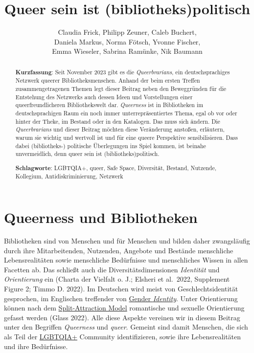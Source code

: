 \documentclass[a4paper,
fontsize=11pt,
oneside,
numbers=noperiodatend,
parskip=half-,
bibliography=totoc,
final
]{scrartcl}
\title{\LARGE{Queer sein ist (bibliotheks)politisch}}%
\author{Claudia Frick, Philipp Zeuner, Caleb Buchert,\\ Daniela Markus, Norma Fötsch, Yvonne Fischer,\\ Emma Wieseler, Sabrina Ramünke, Nik Baumann} %
\date{}
\begin{document}
\maketitle
\thispagestyle{fancyplain} 

\begin{abstract}
\noindent
\textbf{Kurzfassung}: Seit November 2023 gibt es die \textit{Queerbrarians}, ein 
deutschsprachiges Netzwerk queerer Bibliotheksmenschen. Anhand der beim 
ersten Treffen zusammengetragenen Themen legt dieser Beitrag neben den Beweggründen 
für die Entstehung des Netzwerks auch dessen Ideen und Vorstellungen einer 
queerfreundlicheren Bibliothekswelt dar. \textit{Queerness} ist in Bibliotheken im 
deutschsprachigen Raum ein noch immer unterrepräsentiertes Thema, egal ob vor 
oder hinter der Theke, im Bestand oder in den Katalogen. Das muss sich ändern. 
Die \textit{Queerbrarians} und dieser Beitrag möchten diese Veränderung anstoßen, erläutern, 
warum sie wichtig und wertvoll ist und für eine queere Perspektive sensibilisieren. 
Dass dabei (bibliotheks-) politische Überlegungen ins Spiel kommen, ist beinahe 
unvermeidlich, denn queer sein ist (bibliotheks)politisch.
\end{abstract}

\begin{abstract}
\noindent
\textbf{Schlagworte}: LGBTQIA+, queer, Safe Space, Diversität, Bestand, Nutzende, Kollegium, Antidiskriminierung, Netzwerk
\end{abstract}

\section{Queerness und
Bibliotheken}\label{queerness-und-bibliotheken}

Bibliotheken sind von Menschen und für Menschen und bilden daher
zwangsläufig durch ihre Mitarbeitenden, Nutzenden, Angebote und Bestände
menschliche Lebensrealitäten sowie menschliche Bedürfnisse und
menschliches Wissen in allen Facetten ab. Das schließt auch die
Diversitätsdimensionen \emph{Identität} und \emph{Orientierung} ein
(Charta der Vielfalt o. J.; Elsheri et al.~2022, Supplement Figure 2;
Timmo D. 2022). Im Deutschen wird meist von Geschlechtsidentität
gesprochen, im Englischen treffender von
\href{https://lgbtqia.fandom.com/wiki/Gender_identity}{Gender
\emph{Identity}}. Unter Orientierung können nach dem
\href{https://lgbtqia.mywikis.wiki/wiki/Split_Attraction_Model}{Split-Attraction
Model} romantische und sexuelle Orientierung gefasst werden (Glass
2022). Alle diese Aspekte vereinen wir in diesem Beitrag unter den
Begriffen \emph{Queerness} und \emph{queer}. Gemeint sind damit
Menschen, die sich als Teil der
\href{https://lgbtqia.mywikis.wiki/wiki/LGBT}{LGBTQIA+} Community
identifizieren, sowie ihre Lebensrealitäten und ihre Bedürfnisse.
\end{document}
